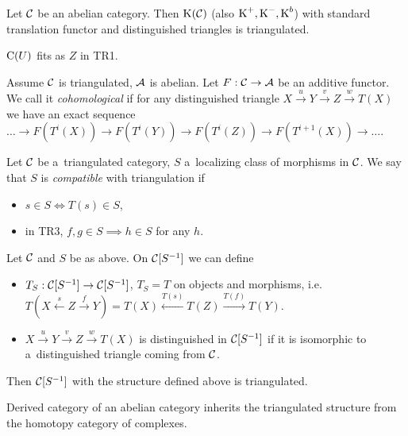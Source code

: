 



	
	\begin{theorem}
		Let $\mathcal{C}$ be an abelian category. Then $\operatorname{K}(\mathcal{C})$
		(also $\operatorname{K}^+, \operatorname{K}^-, \operatorname{K}^b$) with standard translation functor
		and distinguished triangles is triangulated.
	\end{theorem}
	
	\begin{remark}
		$\operatorname{C}(U)$ fits as $Z$ in TR1.
	\end{remark}
	
	\begin{definition}
		Assume $\mathcal{C}$ is triangulated, $\mathcal{A}$ is abelian.
		Let ${F :\mathcal{C} \to \mathcal{A}}$ be an additive functor. We call it 
		{\em cohomological}
		if for any distinguished triangle
		$X \xrightarrow u Y \xrightarrow v Z \xrightarrow w T(X)$
		we have an exact sequence\\
		$\ldots \to F(T^i(X)) \to F(T^i(Y)) \to F(T^i(Z)) 
		\to F(T^{i+1}(X)) \to \ldots$.
	\end{definition}
	
	\begin{definition}
		Let $\mathcal{C}$ be a~triangulated category,
		$S$ a~localizing class of morphisms in $\mathcal{C}$.
		We say that $S$ is {\em compatible} with triangulation if
		\begin{itemize}
			\item $s \in S \iff T(s) \in S$,
			\item in TR3, $f, g \in S \implies h \in S$ for any $h$.
		\end{itemize}
	\end{definition}
	
	\begin{theorem}
		Let $\mathcal{C}$ and $S$ be as above. On $\mathcal{C}[S^{-1}]$
		we can define
		\begin{itemize}
			\item $T_S: \mathcal{C}[S^{-1}] \to \mathcal{C}[S^{-1}]$, $T_S = T$
			on objects and morphisms,
			i.e. $T(X \xleftarrow{s} Z \xrightarrow{f} Y)
			=T(X) \xleftarrow{T(s)} T(Z) \xrightarrow{T(f)} T(Y)$.
			\item 
			$X \xrightarrow u Y \xrightarrow v Z \xrightarrow w T(X)$
			is distinguished in $\mathcal{C}[S^{-1}]$ if it is isomorphic to
			a~distinguished triangle coming from $\mathcal{C}$.
		\end{itemize}
		Then $\mathcal{C}[S^{-1}]$ with the structure defined above is triangulated.
	\end{theorem}
	
	\begin{corollary}
		Derived category of an abelian category inherits
		the triangulated structure from the homotopy
		category of complexes.
	\end{corollary}







 
 
